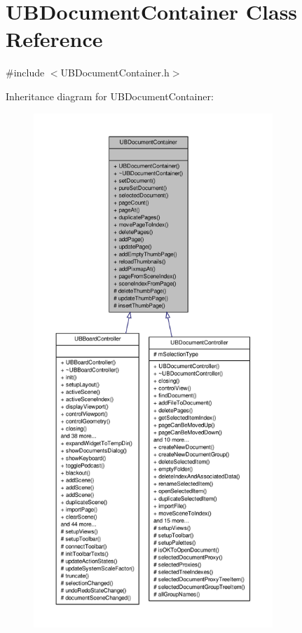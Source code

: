 \hypertarget{class_u_b_document_container}{\section{U\-B\-Document\-Container Class Reference}
\label{da/dc6/class_u_b_document_container}
}


{\ttfamily \#include $<$U\-B\-Document\-Container.\-h$>$}



Inheritance diagram for U\-B\-Document\-Container\-:
\nopagebreak
\begin{figure}[H]
\begin{center}
\leavevmode
\includegraphics[height=550pt]{d7/d01/class_u_b_document_container__inherit__graph}
\end{center}
\end{figure}


